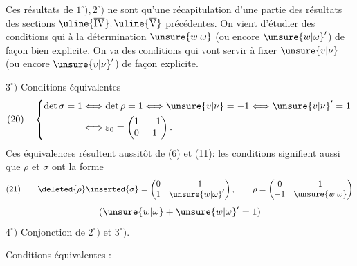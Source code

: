 Ces résultats de $1^\circ),2^\circ)$ ne sont qu'une récapitulation d'une partie des résultats des sections $\uline{\overline{\mathrm{IV}}},\uline{\overline{\mathrm{V}}}$ précédentes.  On vient d'étudier des conditions qui  à la détermination  $\unsure{w|\omega}$ (ou encore  $\unsure{w|\omega}'$) de façon bien explicite. On va  des conditions qui vont servir à fixer $\unsure{v|\nu}$ (ou encore $\unsure{v|\nu}'$) de façon explicite.

$3^\circ)$ Conditions équivalentes
\[
(20)\quad\left\{\begin{aligned}
\det\sigma=1&\Longleftrightarrow\det\rho=1\Longleftrightarrow \unsure{v|\nu}=-1\Longleftrightarrow \unsure{v|\nu}'=1\\
&\Longleftrightarrow\varepsilon_0=\begin{pmatrix}1&-1\\0&1\end{pmatrix}.
\end{aligned}\right.
\]
Ces équivalences résultent aussitôt de (6) et (11): les conditions signifient aussi que $\rho$ et $\sigma$ ont la forme
\[
(21)\qquad \deleted{\rho}\inserted{\sigma}=\begin{pmatrix}0&-1\\1&\unsure{w|\omega}'\end{pmatrix},\qquad\rho=\begin{pmatrix}0&1\\-1&\unsure{w|\omega}\end{pmatrix}
\]
\[
(\unsure{w|\omega}+\unsure{w|\omega}'=1)
\]
$4^\circ)$ Conjonction de $2^\circ)$ et $3^\circ)$.

Conditions équivalentes :


